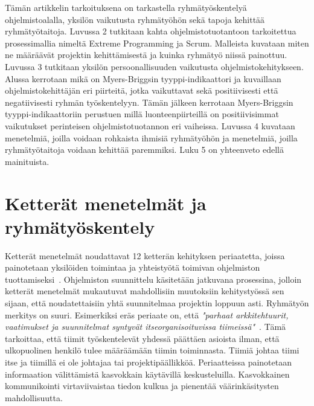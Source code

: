 \documentclass[finnish]{../tktltiki2}
\theoremstyle{definition}
\theoremstyle{remark}
\begin{document}
Tämän artikkelin tarkoituksena on tarkastella ryhmätyöskentelyä ohjelmistoalalla, yksilön vaikutusta ryhmätyöhön sekä tapoja kehittää ryhmätyö\-taitoja.
Luvussa 2 tutkitaan kahta ohjelmistotuotantoon tarkoitettua
prosessimallia nimeltä Extreme Programming ja Scrum. Malleista
kuvataan miten ne määräävät projektin kehittämisestä ja kuinka ryhmätyö niissä painottuu. Luvussa 3 tutkitaan yksilön persoonallisuuden vaikutusta ohjelmistokehitykseen. Alussa kerrotaan
mikä on Myers-Briggsin tyyppi-indikaattori ja kuvaillaan ohjelmistokehittäjän eri piirteitä, jotka vaikuttavat sekä positiivisesti että negatiivisesti ryhmän työskentelyyn. Tämän jälkeen kerrotaan Myers-Briggsin tyyppi-indikaattoriin perustuen millä luonteenpiirteillä on positiivisimmat vaikutukset perinteisen ohjelmistotuotannon eri vaiheissa. Luvussa 4 kuvataan
menetelmiä, joilla voidaan rohkaista ihmisiä ryhmätyöhön ja menetelmiä, joilla ryhmätyötaitoja voidaan kehittää paremmiksi. Luku 5 on yhteenveto
edellä mainituista.

\section{Ketterät menetelmät ja ryhmätyöskentely}


Ketterät menetelmät noudattavat 12 ketterän 
kehityksen periaatetta, joissa painotetaan yksilöiden toimintaa ja yhteistyötä toimivan ohjelmiston tuottamiseksi~\cite{AgileManifesto}. Ohjelmiston suunnittelu käsitetään jatkuvana prosessina, jolloin ketterät menetelmät mukautuvat mahdollisiin muutoksiin kehitystyössä sen sijaan, että noudatettaisiin yhtä suunnitelmaa projektin loppuun asti. Ryhmätyön merkitys on suuri. Esimerkiksi eräs periaate on, että 
\emph{"parhaat arkkitehtuurit, vaatimukset ja suunnitelmat syntyvät 
itseorganisoituvissa
tiimeissä"}~\cite{AgileManifesto}. Tämä tarkoittaa, että tiimit työskentelevät 
yhdessä päättäen asioista ilman, että ulkopuolinen henkilö tulee
määräämään tiimin toiminnasta. Tiimiä johtaa tiimi itse ja 
tiimillä ei ole johtajaa tai projektipäällikköä. Periaatteissa 
painotetaan informaation välittämistä kasvokkain käytävillä keskusteluilla.
Kasvokkainen kommunikointi virtaviivaistaa tiedon kulkua ja pienentää 
väärinkäsitysten mahdollisuutta.\\
\end{document}
